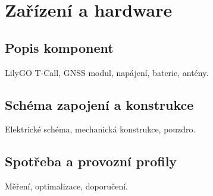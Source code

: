 \chapter{Zařízení a hardware}
\label{chap:hardware}

\section{Popis komponent}
LilyGO T-Call, GNSS modul, napájení, baterie, antény.

\section{Schéma zapojení a konstrukce}
Elektrické schéma, mechanická konstrukce, pouzdro.

\section{Spotřeba a provozní profily}
Měření, optimalizace, doporučení.
